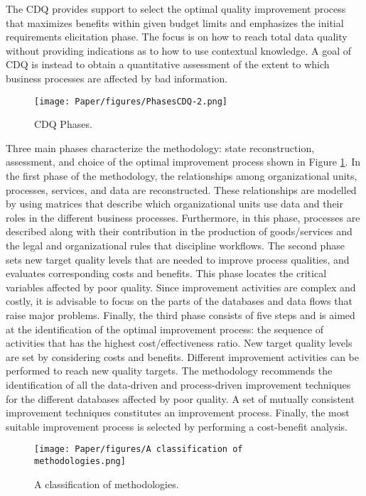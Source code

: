 \documentclass[pdftex,english,oribibl]{llncs}
\begin{document}
The CDQ provides support to select the optimal quality improvement process that maximizes benefits within given budget limits and emphasizes the initial requirements elicitation phase.
The focus is on how to reach total data quality without providing indications as to how to use contextual knowledge. A goal of CDQ is instead to obtain a quantitative assessment of the extent to which business processes are affected by bad information.

\begin{figure}
    \centering
    \texttt{[image: Paper/figures/PhasesCDQ-2.png]}
    \caption{CDQ Phases.}
    \label{fig:PhasesCDQ}
 \end{figure}

Three main phases characterize the methodology: state reconstruction, assessment, and choice of the optimal improvement process shown in Figure \ref{fig:PhasesCDQ}.
In the first phase of the methodology, the relationships among organizational units, processes, services, and data are reconstructed.
These relationships are modelled by using matrices that describe which organizational units use data and their roles in the different business processes.
Furthermore, in this phase, processes are described along with their contribution in the production of goods/services and the legal and organizational rules that discipline workflows.
The second phase sets new target quality levels that are needed to improve process qualities, and evaluates corresponding costs and benefits.
This phase locates the critical variables affected by poor quality. Since improvement activities are complex and costly, it is advisable to focus on the parts of the databases and data flows that raise major problems.
Finally, the third phase consists of five steps and is aimed at the identification of the optimal improvement process: the sequence of activities that has the highest cost/effectiveness ratio.
New target quality levels are set by considering costs and benefits. Different improvement activities can be performed to reach new quality targets.
The methodology recommends the identification of all the data-driven and process-driven improvement techniques for the different databases affected by poor quality.
A set of mutually consistent improvement techniques constitutes an improvement process.
Finally, the most suitable improvement process is selected by performing a cost-benefit analysis.



  \begin{figure}
    \centering
    \texttt{[image: Paper/figures/A classification of methodologies.png]}
    \caption{A classification of methodologies.}
    \label{fig:classificationMethodologies}
  \end{figure}
\end{document}
